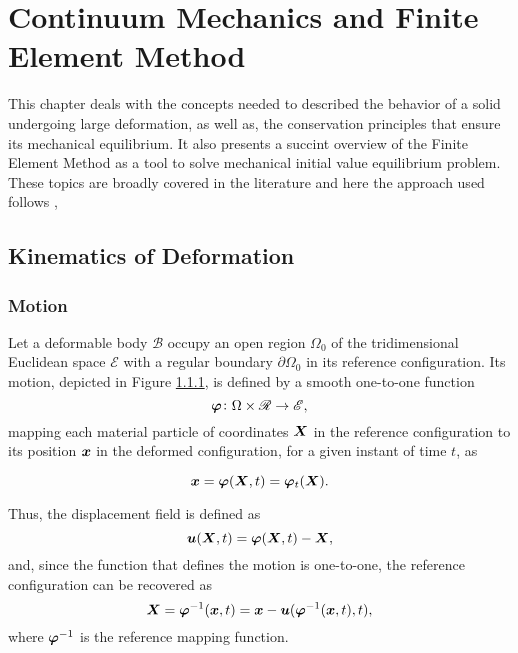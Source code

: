 \chapter{Continuum Mechanics and Finite Element Method} \label{ch:continuum_mechanics}

This chapter deals with the concepts needed to described the behavior of a solid undergoing large deformation, as well as, the conservation principles that ensure its mechanical equilibrium.
It also presents a succint overview of the Finite Element Method as a tool to solve mechanical initial value equilibrium problem.
These topics are broadly covered in the literature and here the approach used follows \cite{de_souza_neto_computational_2008},

\section{Kinematics of Deformation}

\subsection{Motion}

Let a deformable body $\mathscr{B}$ occupy an open region $\Omega_0$ of the tridimensional Euclidean space $\mathscr{E}$ with a regular boundary $\partial \Omega_0$ in its reference configuration.
Its motion, depicted in Figure \ref{}, is defined by a smooth one-to-one function
\begin{equation}
    \bm{\varphi}\colon \Omega\times \mathscr{R}\to \mathscr{E},
\end{equation}
mapping each material particle of coordinates $\bm{X}$ in the reference configuration to its position $\bm{x}$ in the deformed configuration, for a given instant of time $t$, as
\begin{highlight}
    \begin{equation}
        \bm{x} = \bm{\varphi}(\bm{X}, t)=\bm \varphi_t(\bm X).
    \end{equation}
\end{highlight}

\enlargethispage{\baselineskip}
Thus, the displacement field is defined as
\begin{equation}
    \bm{u}(\bm{X}, t) = \bm{\varphi}(\bm{X}, t) - \bm{X},
\end{equation}
and, since the function that defines the motion is one-to-one, the reference configuration can be recovered as
\begin{equation}
    \bm{X} = \bm{\varphi}^{-1} (\bm{x}, t) = \bm{x} - \bm{u}(\bm{\varphi}^{-1}(\bm{x}, t),t),
\end{equation}
where $\bm{\varphi}^{-1}$ is the reference mapping function.

